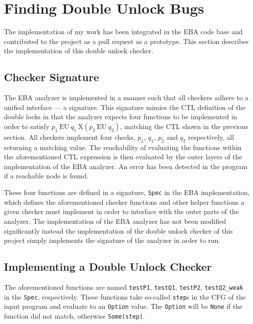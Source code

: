 \section{Finding Double Unlock Bugs}

\newpar The implementation of my work has been integrated in the EBA code base and contributed to the project as a pull request as a prototype. This section describes the implementation of this double unlock checker.

\subsection{Checker Signature}

\newpar The EBA analyzer is implemented in a manner such that all checkers adhere to a unified interface --- a signature. This signature mimics the CTL definition of the double locks in that the analyzer expects four functions to be implemented in order to satisfy $p_1\:\mathrm{EU}\:q_1\:\mathrm{X}(p_2\:\mathrm{EU}\:q_2)$, matching the CTL shown in the previous section. All checkers implement four checks, $p_1$, $q_1$, $p_2$ and $q_2$ respectively, all returning a matching value. The reachability of evaluating the functions within the aforementioned CTL expression is then evaluated by the outer layers of the implementation of the EBA analyzer. An error has been detected in the program if a reachable node is found. 

\newpar These four functions are defined in a signature, \texttt{Spec} in the EBA implementation, which defines the aforementioned checker functions and other helper functions a given checker must implement in order to interface with the outer parts of the analyzer. The implementation of the EBA analyzer has not been modified significantly instead the implementation of the double unlock checker of this project simply implements the signature of the analyzer in order to run. 

\subsection{Implementing a Double Unlock Checker}

\newpar The aforementioned functions are named \texttt{testP1}, \texttt{testQ1}, \texttt{testP2}, \texttt{testQ2\_weak} in the \texttt{Spec}, respectively. These functions take so-called \texttt{step}s in the CFG of the input program and evaluate to an \texttt{Option} value. The \texttt{Option} will be \texttt{None} if the function did not match, otherwise \texttt{Some(step)}. 

